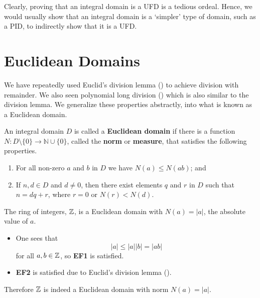 Clearly, proving that an integral domain is a UFD is a tedious ordeal. Hence, we would usually show that an integral domain is a `simpler' type of domain, such as a PID, to indirectly show that it is a UFD.

\section{Euclidean Domains}
We have repeatedly used Euclid's division lemma () to achieve division with remainder. We also seen polynomial long division () which is also similar to the division lemma. We generalize these properties abstractly, into what is known as a Euclidean domain.

\begin{definition}
    An integral domain $D$ is called a \textbf{Euclidean domain} if there is a function $N: D \setminus \{0\} \to \mathbb{N} \cup \{0\}$, called the \textbf{norm} or \textbf{measure}, that satisfies the following properties.
    \begin{enumerate}[leftmargin=3em,label=\textbf{EF\arabic*}.]
        \item For all non-zero $a$ and $b$ in $D$ we have $N(a) \leq N(ab)$; and
        \item If $n, d \in D$ and $d \neq 0$, then there exist elements $q$ and $r$ in $D$ such that $n = dq + r$, where $r = 0$ or $N(r) < N(d)$.
    \end{enumerate}
\end{definition}

\begin{example}
    The ring of integers, $\mathbb{Z}$, is a Euclidean domain with $N(a) = |a|$, the absolute value of $a$.
    \begin{itemize}
        \item One sees that
        \[
            |a| \leq |a||b| = |ab|
        \]
        for all $a,b\in \mathbb{Z}$, so \textbf{EF1} is satisfied.

        \item \textbf{EF2} is satisfied due to Euclid's division lemma ().
    \end{itemize}
    Therefore $\mathbb{Z}$ is indeed a Euclidean domain with norm $N(a) = |a|$.
\end{example}

